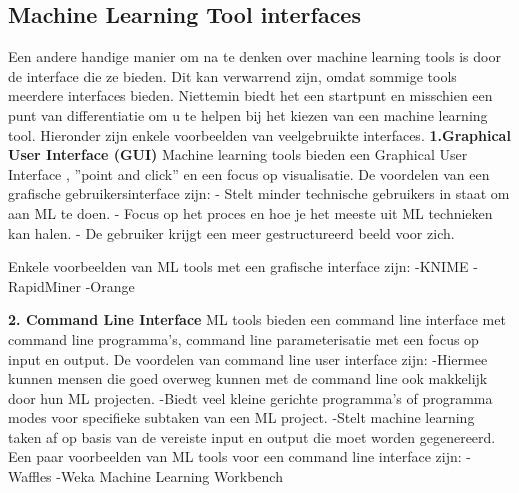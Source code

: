 \subsection{Machine Learning Tool interfaces}
Een andere handige manier om na te denken over machine learning tools is door de interface die ze bieden. Dit kan verwarrend zijn, omdat sommige tools meerdere interfaces bieden. Niettemin biedt het een startpunt en misschien een punt van differentiatie om u te helpen bij het kiezen van een machine learning tool.
Hieronder zijn enkele voorbeelden van veelgebruikte interfaces.\newline
\textbf{1.Graphical User Interface (GUI)}\newline
Machine learning tools bieden een Graphical User Interface , ”point and click” en een focus op visualisatie. 
De voordelen van een grafische gebruikersinterface zijn:\newline
- Stelt minder technische gebruikers in staat om aan ML te doen.\newline
- Focus op het proces en hoe je het meeste uit ML technieken kan halen.\newline
- De gebruiker krijgt een meer gestructureerd beeld voor zich.

Enkele voorbeelden van ML tools met een grafische interface zijn:\newline
-KNIME \newline
-RapidMiner \newline
-Orange \newline

\textbf{2. Command Line Interface} \newline
ML tools bieden een command line interface met command line programma’s, command line parameterisatie met een focus op input en output. De voordelen van command line user interface zijn: \newline
-Hiermee kunnen mensen die goed overweg kunnen met de command line ook makkelijk door hun ML projecten. \newline
-Biedt veel kleine gerichte programma’s of programma modes voor specifieke subtaken van een ML project. \newline
-Stelt machine learning taken af op basis van de vereiste input en output die moet worden gegenereerd.\newline
Een paar voorbeelden van ML tools voor een command line interface zijn:\newline
-Waffles\newline
-Weka Machine Learning Workbench

